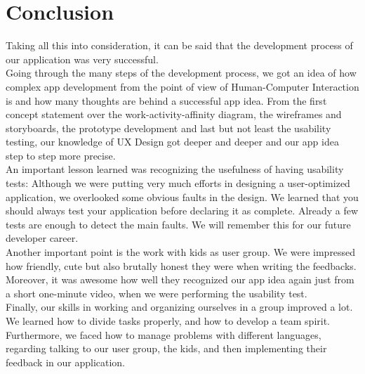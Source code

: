 \documentclass[12pt]{scrartcl}
\begin{document}
	
\section{Conclusion}

	
	Taking all this into consideration, it can be said that the development process of our application was very successful.\\

	Going through the many steps of the development process, we got an idea of how complex app development from the point of view of Human-Computer Interaction is and how many thoughts are behind a successful app idea. From the first concept statement over the work-activity-affinity diagram, the wireframes and storyboards, the prototype development and last but not least the usability testing, our knowledge of UX Design got deeper and deeper and our app idea step to step more precise.\\
	
	An important lesson learned was recognizing the usefulness of having usability tests: Although we were putting very much efforts in designing a user-optimized application, we overlooked some obvious faults in the design. We learned that you should always test your application before declaring it as complete. Already a few tests are enough to detect the main faults. We will remember this for our future developer career.\\
	
	Another important point is the work with kids as user group. We were impressed how friendly, cute but also brutally honest they were when writing the feedbacks. Moreover, it was awesome how well they recognized our app idea again just from a short one-minute video, when we were performing the usability test.\\
	
	Finally, our skills in working and organizing ourselves in a group improved a lot. We learned how to divide tasks properly, and how to develop a team spirit. Furthermore, we faced how to manage problems with different languages, regarding talking to our user group, the kids, and then implementing their feedback in our application.
	
	
\end{document}
